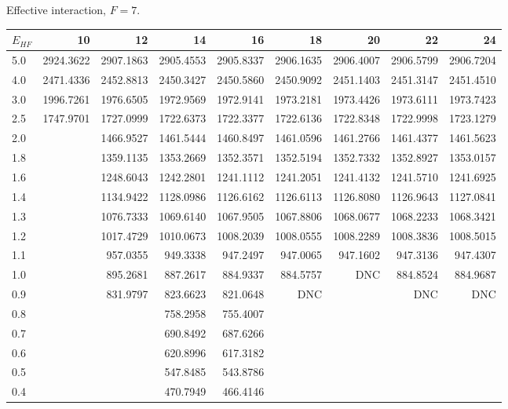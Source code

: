 \begin{landscape}
\begin{table}
\begin{center}
Effective interaction, $F=7$.\\
\begin{tabular}{l|rrrrrrrr}
\hline 
$E_{HF}$ & 10 & 12 & 14 & 16 & 18 & 20 & 22 & 24 \\
\hline \hline
5.0 & 2924.3622 & 2907.1863 & 2905.4553 & 2905.8337 & 2906.1635 & 2906.4007 & 2906.5799 & 2906.7204 \\ 
4.0 & 2471.4336 & 2452.8813 & 2450.3427 & 2450.5860 & 2450.9092 & 2451.1403 & 2451.3147 & 2451.4510 \\ 
3.0 & 1996.7261 & 1976.6505 & 1972.9569 & 1972.9141 & 1973.2181 & 1973.4426 & 1973.6111 & 1973.7423 \\ 
2.5 & 1747.9701 & 1727.0999 & 1722.6373 & 1722.3377 & 1722.6136 & 1722.8348 & 1722.9998 & 1723.1279 \\ 
2.0 &			& 1466.9527 & 1461.5444 & 1460.8497 & 1461.0596 & 1461.2766 & 1461.4377 & 1461.5623 \\ 
1.8 &			& 1359.1135 & 1353.2669 & 1352.3571 & 1352.5194 & 1352.7332 & 1352.8927 & 1353.0157 \\ 
1.6 &			& 1248.6043 & 1242.2801 & 1241.1112 & 1241.2051 & 1241.4132 & 1241.5710 & 1241.6925 \\ 
1.4 &			& 1134.9422 & 1128.0986 & 1126.6162 & 1126.6113 & 1126.8080 & 1126.9643 & 1127.0841 \\ 
1.3 &			& 1076.7333 & 1069.6140 & 1067.9505 & 1067.8806 & 1068.0677 & 1068.2233 & 1068.3421 \\ 
1.2 &			& 1017.4729 & 1010.0673 & 1008.2039 & 1008.0555 & 1008.2289 & 1008.3836 & 1008.5015 \\ 
1.1 &			&  957.0355 &  949.3338 &  947.2497 &  947.0065 &  947.1602 &  947.3136 &  947.4307 \\ 
1.0 &			&  895.2681 &  887.2617 &  884.9337 &  884.5757 &  DNC      &  884.8524 &  884.9687 \\ 
0.9 &			&  831.9797 &  823.6623 &  821.0648 &  DNC      &           &       DNC &       DNC  \\
0.8 &			&			&  758.2958 &  755.4007  \\ 
0.7 &			&			&  690.8492 &  687.6266  \\ 
0.6 &			&			&  620.8996 &  617.3182  \\ 
0.5 &			&			&  547.8485 &  543.8786  \\ 
0.4 &			&			&  470.7949 &  466.4146  \\ 

\end{tabular}
\end{center}
\end{table}
\end{landscape}
